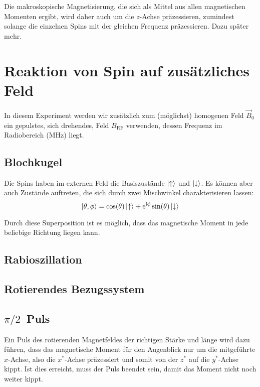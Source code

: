 Die makroskopische Magnetisierung, die sich als Mittel aus allen magnetischen
Momenten ergibt, wird daher auch um die $z$-Achse präzessieren, zumindest
solange die einzelnen Spins mit der gleichen Frequenz präzessieren. Dazu später
mehr.

\section{Reaktion von Spin auf zusätzliches Feld}

In diesem Experiment werden wir zusätzlich zum (möglichst) homogenen Feld $\vec
B_0$ ein gepulstes, sich drehendes, Feld $B_\text{RF}$ verwenden, dessen
Frequenz im Radiobereich (\si{\mega\hertz}) liegt.

\subsection{Blochkugel}

Die Spins haben im externen Feld die Basiszustände $\ket\uparrow$ und
$\ket\downarrow$. Es können aber auch Zustände auftreten, die sich durch zwei
Mischwinkel charakterisieren lassen:
\[
    \ket{\theta, \phi}
    = \cos(\theta) \ket\uparrow + \mathrm e^{\mathrm i \phi} \sin(\theta) \ket\downarrow
\]

Durch diese Superposition ist es möglich, dass das magnetische Moment in jede
beliebige Richtung liegen kann.

\subsection{Rabioszillation}

\cite[Abschnitt~15.9.5 „Rabi-Atomstrahlresonanz”]{meschede-gerthsen_24}

\cite{wikipedia/Rabi_Oszillation}

\subsection{Rotierendes Bezugssystem}
\subsection{$\pi/2$–Puls}

Ein Puls des rotierenden Magnetfeldes der richtigen Stärke und länge wird dazu
führen, dass das magnetische Moment für den Augenblick nur um die mitgeführte
$x$-Achse, also die $x^*$-Achse präzessiert und somit von der $z^*$ auf die
$y^*$-Achse kippt. Ist dies erreicht, muss der Puls beendet sein, damit das
Moment nicht noch weiter kippt.

